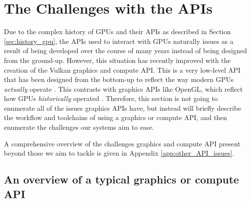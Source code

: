 \documentclass[a4paper,12pt,twoside,openright]{report}
\begin{document}
\section{The Challenges with the APIs}

\label{sec:api_challanges}



Due to the complex history of GPUs and their APIs as described in Section
\ref{sec:history_gpu}, the APIs used to interact with GPUs naturally issues as
a result of being developed over the course of many years instead of being
designed from the ground-up. However, this situation has recently improved with
the creation of the Vulkan graphics and compute API. This is a very low-level
API that has been designed from the bottom-up to reflect the way modern GPUs
\textit{actually} operate \cite{Vulkan}. This contrasts with graphics APIs like
OpenGL, which reflect how GPUs \textit{historically} operated \cite{TODO}.
Therefore, this section is not going to enumerate all of the issues graphics
APIs have, but instead will briefly describe the workflow and toolchains of
using a graphics or compute API, and then enumerate the challenges our systems
aim to ease.

A comprehensive overview of the challenges graphics and compute API present
beyond those we aim to tackle is given in Appendix \ref{app:other_API_issues}.

\subsection{An overview of a typical graphics or compute API}

\end{document}
